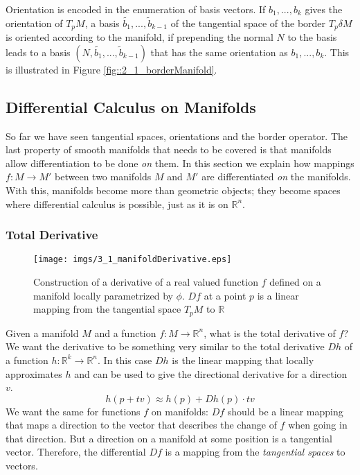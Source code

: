 Orientation is encoded in the enumeration of basis vectors. If $b_1,...,b_k$ gives the orientation of $T_pM$,
a basis $\widetilde{b_1},...,\widetilde{ b}_{k-1}$ of the tangential space of the border $T_p\delta M$ is oriented according to the manifold, if prepending the normal $N$ to the basis leads to a basis $(N,\widetilde{b_1},...,\widetilde{ b}_{k-1})$ that has the same orientation as $b_1,...,b_k$. This is illustrated in Figure \ref{fig::2_1_borderManifold}.


\subsection{Differential Calculus on Manifolds}
\label{sec::2_derivativesOnMF}
So far we have seen tangential spaces, orientations and the border operator. The last property of smooth manifolds that needs to be covered is that manifolds allow differentiation to be done \emph{on} them. In this section we explain how mappings $f:M\to M'$ between two manifolds $M$ and $M'$ are differentiated \emph{on} the manifolds.  With this, manifolds become  more than geometric objects; they become spaces where differential calculus is possible, just as it is on $\mathbb R^n$. %

\subsubsection{Total Derivative}

\begin{figure}
\begin{center}
\texttt{[image: imgs/3\_1\_manifoldDerivative.eps]}
\end{center}
\caption{Construction of a derivative of a real valued function $f$ defined on a manifold locally parametrized by $\phi$. $Df$ at a point $p$ is a linear mapping from the tangential space $T_p M$ to $\mathbb R$}
\label{fig::3_1_manifoldDerivative}
\end{figure}

Given a manifold $M$ and a function $f: M \rightarrow \mathbb R^n$, what is the total derivative of $f$? We want the derivative to be something very similar to the total derivative $Dh$ of a function $h: \mathbb R^k \rightarrow \mathbb R^n$. In this case $Dh$ is the linear mapping that locally approximates $h$ and can be used to give the directional derivative for a direction $v$.
\[h( p + tv) \approx h(p) + Dh(p) \cdot tv\]
We want the same for functions $f$ on manifolds: $Df$ should be a linear mapping that maps a direction to the vector that describes the change of $f$ when going in that direction. But a direction on a manifold at some position is a tangential vector. Therefore, the differential $Df$ is a mapping from the \emph{tangential spaces} to vectors.

